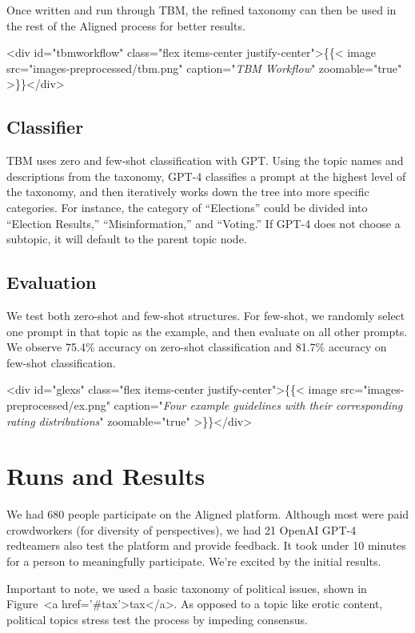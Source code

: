 \documentclass{article}
\begin{document}
\begin{multicols}{2}
Once written and run through TBM, the refined taxonomy can then be used in the rest of the Aligned process for better results.

<div id="tbmworkflow" class="flex items-center justify-center">\{\{< image src="images-preprocessed/tbm.png" caption="\textit{TBM Workflow}" zoomable="true" >\}\}</div>


\vspace{-10pt}

\subsection{Classifier}

TBM uses zero and few-shot classification with GPT. Using the topic names and descriptions from the taxonomy, GPT-4 classifies a prompt at the highest level of the taxonomy, and then iteratively works down the tree into more specific categories. For instance, the category of “Elections” could be divided into “Election Results,” “Misinformation,” and “Voting.” If GPT-4 does not choose a subtopic, it will default to the parent topic node.

\subsection{Evaluation}

We test both zero-shot and few-shot structures. For few-shot, we randomly select one prompt in that topic as the example, and then evaluate on all other prompts. We observe 75.4\% accuracy on zero-shot classification and 81.7\% accuracy on few-shot classification. 

<div id="glexs" class="flex items-center justify-center">\{\{< image src="images-preprocessed/ex.png" caption="\textit{Four example guidelines with their corresponding rating distributions}" zoomable="true" >\}\}</div>



\section{Runs and Results}

We had 680 people participate on the Aligned platform. Although most were paid crowdworkers (for diversity of perspectives), we had 21 OpenAI GPT-4 redteamers also test the platform and provide feedback. It took under 10 minutes for a person to meaningfully participate. We’re excited by the initial results.

Important to note, we used a basic taxonomy of political issues, shown in Figure~<a href='#tax'>tax</a>. As opposed to a topic like erotic content, political topics stress test the process by impeding consensus.



\end{multicols}
\end{document}
